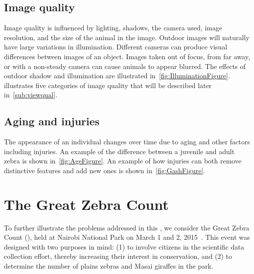     \subsection{Image quality}
        Image quality is influenced by lighting, shadows, the camera used, image resolution, and the size of the animal
        in the image. Outdoor images will naturally have large variations in illumination. Different cameras can produce
        visual differences between images of an object. Images taken out of focus, from far away, or with a non-steady
        camera can cause animals to appear blurred. The effects of outdoor shadow and illumination are illustrated
        in~\cref{fig:IlluminationFigure}.  illustrates five categories of image quality that
        will be described later in~\cref{sub:viewqual}.

        \IlluminationFigure{}

        \QualityFigure{}

    \subsection{Aging and injuries}
        The appearance of an individual changes over time due to aging and other factors including injuries. An example
        of the difference between a juvenile and adult zebra is shown in~\cref{fig:AgeFigure}. An example of how
        injuries can both remove distinctive features and add new ones is shown in~\cref{fig:GashFigure}.

        \AgeFigure{}

        \GashFigure{}

\section{The Great Zebra Count}\label{sec:introgzc}

    To further illustrate the problems addressed in this \thesis{}, we consider the Great Zebra Count (\GZC{}),
    held at Nairobi National Park on March 1\st{} and 2\nd{}, 2015~\cite{rubenstein_great_2015}. This event was
    designed with two purposes in mind: (1) to involve citizens in the scientific data collection effort, thereby
    increasing their interest in conservation, and (2) to determine the number of plains zebras and Masai giraffes
    in the park.

